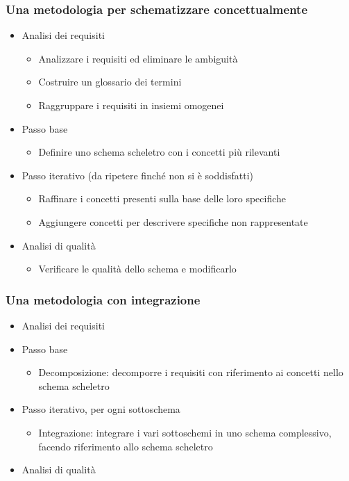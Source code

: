\documentclass[../main.tex]{subfiles}
\begin{document}
	\subsubsection{Una metodologia per schematizzare concettualmente}
	\begin{itemize}
		\item Analisi dei requisiti
		\begin{itemize}
			\item Analizzare i requisiti ed eliminare le ambiguità
			\item Costruire un glossario dei termini
			\item Raggruppare i requisiti in insiemi omogenei
		\end{itemize}
		\item Passo base
		\begin{itemize}
			\item Definire uno schema scheletro con i concetti più rilevanti
		\end{itemize}
		\item Passo iterativo (da ripetere finché non si è soddisfatti)
		\begin{itemize}
			\item Raffinare i concetti presenti sulla base delle loro specifiche
			\item Aggiungere concetti per descrivere specifiche non rappresentate
		\end{itemize}
		\item Analisi di qualità
		\begin{itemize}
			\item Verificare le qualità dello schema e modificarlo
		\end{itemize}
	\end{itemize}
	\subsubsection{Una metodologia con integrazione}
	\begin{itemize}
		\item Analisi dei requisiti
		\item Passo base
		\begin{itemize}
			\item Decomposizione: decomporre i requisiti con riferimento ai concetti nello schema scheletro
		\end{itemize}
		\item Passo iterativo, per ogni sottoschema
		\begin{itemize}
			\item Integrazione: integrare i vari sottoschemi in uno schema complessivo, facendo riferimento allo schema scheletro
		\end{itemize}
		\item Analisi di qualità
	\end{itemize}
\end{document}
